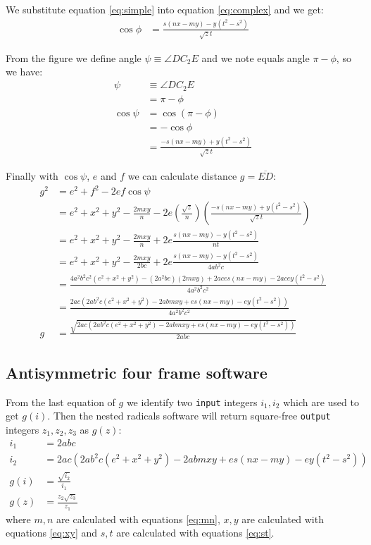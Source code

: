 \documentclass[11pt]{article}
\begin{document}
We substitute equation \ref{eq:simple} into equation \ref{eq:complex} and we get:
\begin{align}
\cos\phi &= \frac{s(nx - my) - y(t^2-s^2)}{\sqrt{z}t}
\end{align}

From the figure we define angle $\psi \equiv \angle{DC_2E}$ and we note equals angle $\pi - \phi$, so we have:
\begin{align}
\psi &\equiv \angle{DC_2E}\\
 &= \pi - \phi\\
\cos\psi &= \cos(\pi - \phi)\\
 &= -\cos\phi\nonumber\\
 &= \frac{-s(nx - my) + y(t^2-s^2)}{\sqrt{z}t}
\end{align}

Finally with $\cos\psi$, $e$ and $f$ we can calculate distance $g = \overline{ED}$:
\begin{align}
g^2 &= e^2 + f^2 - 2ef\cos\psi\\
 &= e^2 + x^2 + y^2 - \frac{2mxy}{n} 
 - 2e\left(\frac{\sqrt{z}}n\right)\left(\frac{-s(nx - my) + y(t^2-s^2)}{\sqrt{z}t}\right)\\
 &= e^2 + x^2 + y^2 - \frac{2mxy}{n} + 2e\frac{s(nx - my) - y(t^2-s^2)}{nt}\\
 &= e^2 + x^2 + y^2 - \frac{2mxy}{2bc} + 2e\frac{s(nx - my) - y(t^2-s^2)}{4ab^2c}\\
 &= \frac{4a^2b^2c^2(e^2 + x^2 + y^2) - (2a^2bc)(2mxy) + 2aces(nx - my) - 2acey(t^2-s^2)}{4a^2b^2c^2}\nonumber\\
 &= \frac{2ac(2ab^2c(e^2 + x^2 + y^2) - 2abmxy + es(nx - my) - ey(t^2-s^2))}{4a^2b^2c^2}\nonumber\\
g &= \frac{\sqrt{2ac(2ab^2c(e^2 + x^2 + y^2) - 2abmxy + es(nx - my) - ey(t^2-s^2))}}{2abc}
%
\end{align}

\subsection{Antisymmetric four frame software}

From the last equation of $g$ we identify two \texttt{input} integers $i_1,i_2$ which are used to get $g(i)$. Then the nested radicals software will return square-free \texttt{output} integers $z_1,z_2,z_3$ as $g(z)$:
\begin{align}
i_1 &= 2abc\\
i_2 &= 2ac(2ab^2c(e^2 + x^2 + y^2) - 2abmxy + es(nx - my) - ey(t^2-s^2))\\
g(i) &= \frac{\sqrt{i_2}}{i_1}\\
g(z) &= \frac{z_2\sqrt{z_3}}{z_1}
\end{align}
where $m,n$ are calculated with equations \ref{eq:mn}, $x,y$ are calculated with equations \ref{eq:xy} and $s,t$ are calculated with equations \ref{eq:st}.
\end{document}
